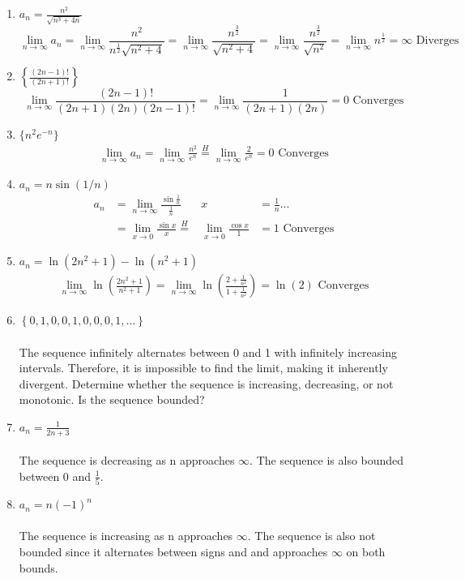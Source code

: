 \documentclass[12pt]{article}
\begin{document}
\begin{enumerate}
    \addtocounter{enumi}{3}\item $a_n=\frac{n^2}{\sqrt{n^3+4n}}$
    \begin{equation*}
        \lim_{n\to\infty}a_n=\lim_{n\to\infty}\frac{n^2}{n^\frac{1}{2}\sqrt{n^2+4}} = \lim_{n\to\infty}\frac{n^\frac{3}{2}}{\sqrt{n^2+4}}=\lim_{n\to\infty}\frac{n^\frac{3}{2}}{\sqrt{n^2}}=\lim_{n\to\infty}n^\frac{1}{2}=\infty \text{ Diverges}
    \end{equation*}
    \addtocounter{enumi}{3}\item $\left\{\frac{(2n-1)!}{(2n+1)!}\right\}$\
    \begin{equation*}
        \lim_{n\to\infty}\frac{(2n-1)!}{(2n+1)(2n)(2n-1)!}=\lim_{n\to\infty}\frac{1}{(2n+1)(2n)} = 0 \text{ Converges}
    \end{equation*}
    \addtocounter{enumi}{3}\item $\{n^2e^{-n}\}$
        \begin{align*}
            \lim_{n\to\infty}a_n=\lim_{n\to\infty}\frac{n^2}{e^n}\stackrel{H}{=}\lim_{n\to\infty}\frac{2}{e^n}=0 \text{ Converges}
        \end{align*}
    \addtocounter{enumi}{3}\item $a_n=n\sin(1/n)$
    \begin{align*}
        a_n&=\lim_{n\to\infty}\frac{\sin{\frac{1}{n}}}{\frac{1}{n}} & x &= \frac{1}{n} ...\\
        &=\lim_{x\to 0}\frac{\sin{x}}{x}\stackrel{H}{=}&\lim_{x\to 0}\frac{\cos{x}}{1}&=1 \text{ Converges}
    \end{align*}
    \addtocounter{enumi}{3}\item $a_n=\ln{(2n^2+1)}-\ln{(n^2+1)}$
    \begin{align*}
        \lim_{n\to\infty}\ln{\left(\frac{2n^2+1}{n^2+1}\right)}=\lim_{n\to\infty}\ln{\left(\frac{2+\frac{1}{n^2}}{1+\frac{1}{n^2}}\right)} = \ln{(2)} \text{ Converges}
    \end{align*}
    \addtocounter{enumi}{3}\item $\left\{0,1,0,0,1,0,0,0,1,...\right\}$\\\\
    The sequence infinitely alternates between 0 and 1 with infinitely increasing intervals. Therefore, it is impossible to find the limit, making it inherently divergent.\newpage
    Determine whether the sequence is increasing, decreasing, or not monotonic. Is the sequence bounded?
    \addtocounter{enumi}{19}\item $a_n=\frac{1}{2n+3}$\\\\
    The sequence is decreasing as n approaches $\infty$. The sequence is also bounded between 0 and $\frac{1}{5}$.
    \addtocounter{enumi}{1}\item $a_n=n(-1)^n$\\\\
    The sequence is increasing as n approaches $\infty$. The sequence is also not bounded since it alternates between signs and and approaches $\infty$ on both bounds.
    

\end{enumerate}
\end{document}
